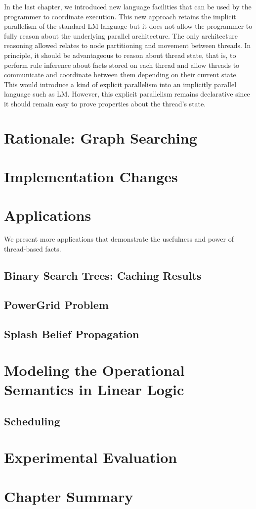 In the last chapter, we introduced new language facilities that can be used by
the programmer to coordinate execution. This new approach retains the implicit
parallelism of the standard LM language but it does not allow the programmer to
fully reason about the underlying parallel architecture. The only architecture
reasoning allowed relates to node partitioning and movement between threads. In
principle, it should be advantageous to reason about thread state, that is, to
perform rule inference about facts stored on each thread and allow threads to
communicate and coordinate between them depending on their current state. This
would introduce a kind of explicit parallelism into an implicitly parallel
language such as LM. However, this explicit parallelism remains declarative
since it should remain easy to prove properties about the thread's state.

\section{Rationale: Graph Searching}


\section{Implementation Changes}


\section{Applications}

We present more applications that demonstrate the usefulness and power of thread-based facts.

\subsection{Binary Search Trees: Caching Results}


\subsection{PowerGrid Problem}


\subsection{Splash Belief Propagation}


\section{Modeling the Operational Semantics in Linear Logic}
\subsection{Scheduling}

\section{Experimental Evaluation}

\section{Chapter Summary}

